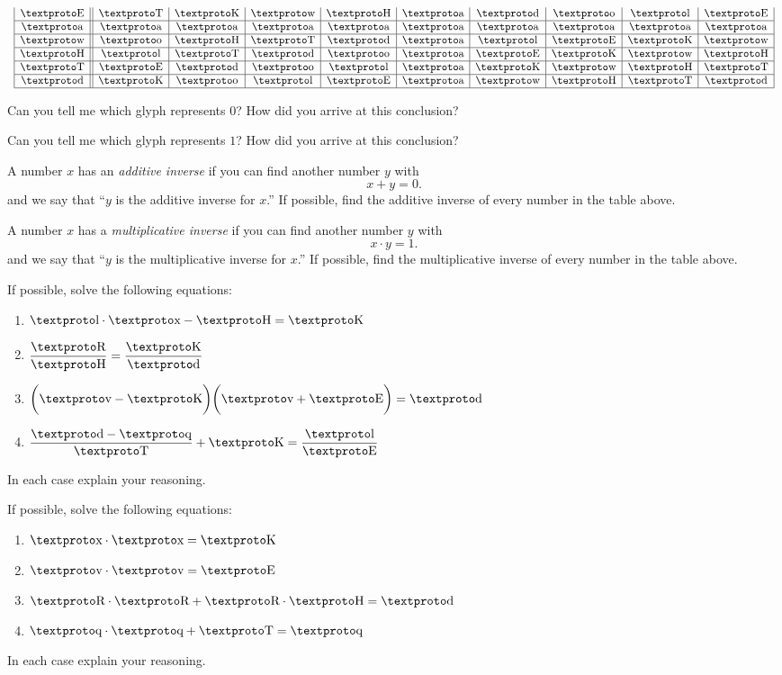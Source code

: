 \documentclass{ximera}
\begin{document}
\[{\begin{array}{clc}
{\begin{array}{|c||c|c|c|c|c|c|c|c|c|}
\lf   & \lc & \ld & \la & \lb & \lo &\loo & \li & \lh & \lf \\ \hline
\lo   & \lo & \lo & \lo & \lo & \lo & \lo & \lo & \lo & \lo \\ \hline
\la   & \li & \lb & \lc &\loo & \lo & \lh & \lf & \ld & \la \\ \hline
\lb   & \lh & \lc &\loo & \li & \lo & \lf & \ld & \la & \lb \\ \hline
\lc   & \lf &\loo & \li & \lh & \lo & \ld & \la & \lb & \lc \\ \hline
\loo  & \ld & \li & \lh & \lf & \lo & \la & \lb & \lc &\loo \\ \hline
\end{array}} 
\end{array}}
\]

\newpage



\begin{problem} 
Can you tell me which glyph represents $0$? How did you arrive at this
conclusion?
\end{problem}

\begin{problem} 
Can you tell me which glyph represents $1$? How did you arrive at this
conclusion?
\end{problem}

\begin{problem}
A number $x$ has an \textit{additive inverse} if you can find another number $y$ with 
\[
x + y = 0.
\]
and we say that ``$y$ is the additive inverse for $x$.'' If possible,
find the additive inverse of every number in the table above.
\end{problem}

\begin{problem}
A number $x$ has a \textit{multiplicative inverse} if you can find
another number $y$ with
\[
x\cdot y = 1.
\]
and we say that ``$y$ is the multiplicative inverse for $x$.'' If
possible, find the multiplicative inverse of every number in the
table above.
\end{problem}



\begin{problem} If possible, solve the following equations:
\begin{enumerate}
\item $\lh \cdot \lx - \lb = \ld$
\item $\dfrac{\ly}{\lb} = \dfrac{\ld}{\loo}$
\item $\bigg(\lz - \ld\bigg)\bigg(\lz + \lf\bigg)=\loo$
\item $\dfrac{\loo - \lw}{\lc} + \ld = \dfrac{\lh}{\lf}$
\end{enumerate}
In each case explain your reasoning.
\end{problem}

\begin{problem} If possible, solve the following equations:
\begin{enumerate}
\item $\lx \cdot \lx = \ld$
\item $\lz\cdot \lz = \lf$
\item $\ly\cdot \ly + \ly \cdot \lb = \loo$
\item $\lw \cdot \lw+ \lc = \lw$
\end{enumerate}
In each case explain your reasoning.
\end{problem}
\end{document}
